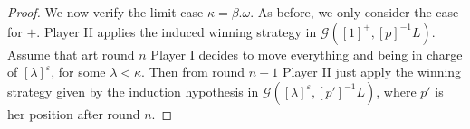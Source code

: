 \begin{proof}
We now verify the limit case $\kappa= \beta.\omega$. As before, we only consider the case for $+$. Player II applies the induced winning strategy in $\mathcal{G}([1]^+, [p]^{-1}L)$. Assume that art round $n$ Player I decides to move everything and being in charge of $[\lambda]^\varepsilon$, for some $\lambda < \kappa$. Then from round $n+1$ Player II just apply the winning strategy given by the induction hypothesis in $\mathcal{G}([\lambda]^\varepsilon, [p']^{-1}L)$, where $p'$ is her position after round $n$.
\end{proof}


